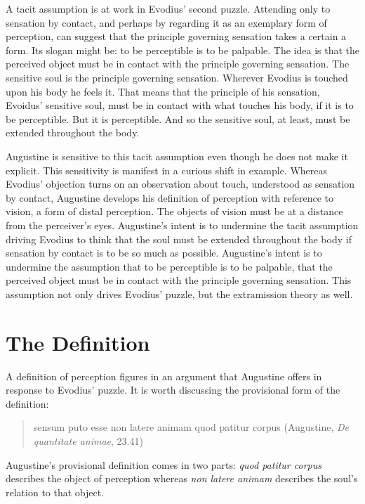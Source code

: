 \documentclass[12pt]{article}
\begin{document}
A tacit assumption is at work in Evodius' second puzzle. Attending only to sensation by contact, and perhaps by regarding it as an exemplary form of perception, can suggest that the principle governing sensation takes a certain a form. Its slogan might be: to be perceptible is to be palpable. The idea is that the perceived object must be in contact with the principle governing sensation. The sensitive soul is the principle governing sensation. Wherever Evodius is touched upon his body he feels it. That means that the principle of his sensation, Evoidus' sensitive soul, must be in contact with what touches his body, if it is to be perceptible. But it is perceptible. And so the sensitive soul, at least, must be extended throughout the body.

Augustine is sensitive to this tacit assumption even though he does not make it explicit. This sensitivity is manifest in a curious shift in example. Whereas Evodius' objection turns on an observation about touch, understood as sensation by contact, Augustine develops his definition of perception with reference to vision, a form of distal perception. The objects of vision must be at a distance from the perceiver's eyes. Augustine's intent is to undermine the tacit assumption driving Evodius to think that the soul must be extended throughout the body if sensation by contact is to be so much as possible. Augustine's intent is to undermine the assumption that to be perceptible is to be palpable, that the perceived object must be in contact with the principle governing sensation. This assumption not only drives Evodius' puzzle, but the extramission theory as well. 


\section{The Definition} %
\label{sec:the_definition}

A definition of perception figures in an argument that Augustine offers in response to Evodius' puzzle. It is worth discussing the provisional form of the definition: 
\begin{quote}
	sensum puto esse non latere animam quod patitur corpus (Augustine, \emph{De quantitate animae}, 23.41)
\end{quote}
Augustine's provisional definition comes in two parts: \emph{quod patitur corpus} describes the object of perception whereas \emph{non latere animam} describes the soul's relation to that object. 
\end{document}
